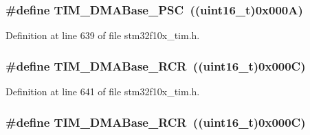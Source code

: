 \subsubsection[{\texorpdfstring{T\+I\+M\+\_\+\+D\+M\+A\+Base\+\_\+\+P\+SC}{TIM_DMABase_PSC}}]{\setlength{\rightskip}{0pt plus 5cm}\#define T\+I\+M\+\_\+\+D\+M\+A\+Base\+\_\+\+P\+SC~(({\bf uint16\+\_\+t})0x000\+A)}\hypertarget{group___t_i_m___d_m_a___base__address_gab8dd06970f235fe9f6997e0975237388}{}\label{group___t_i_m___d_m_a___base__address_gab8dd06970f235fe9f6997e0975237388}


Definition at line 639 of file stm32f10x\+\_\+tim.\+h.

\subsubsection[{\texorpdfstring{T\+I\+M\+\_\+\+D\+M\+A\+Base\+\_\+\+R\+CR}{TIM_DMABase_RCR}}]{\setlength{\rightskip}{0pt plus 5cm}\#define T\+I\+M\+\_\+\+D\+M\+A\+Base\+\_\+\+R\+CR~(({\bf uint16\+\_\+t})0x000\+C)}\hypertarget{group___t_i_m___d_m_a___base__address_ga97f9edceee5c99b32aaa2c6daf849b7d}{}\label{group___t_i_m___d_m_a___base__address_ga97f9edceee5c99b32aaa2c6daf849b7d}


Definition at line 641 of file stm32f10x\+\_\+tim.\+h.

\subsubsection[{\texorpdfstring{T\+I\+M\+\_\+\+D\+M\+A\+Base\+\_\+\+R\+CR}{TIM_DMABase_RCR}}]{\setlength{\rightskip}{0pt plus 5cm}\#define T\+I\+M\+\_\+\+D\+M\+A\+Base\+\_\+\+R\+CR~(({\bf uint16\+\_\+t})0x000\+C)}\hypertarget{group___t_i_m___d_m_a___base__address_ga97f9edceee5c99b32aaa2c6daf849b7d}{}\label{group___t_i_m___d_m_a___base__address_ga97f9edceee5c99b32aaa2c6daf849b7d}


